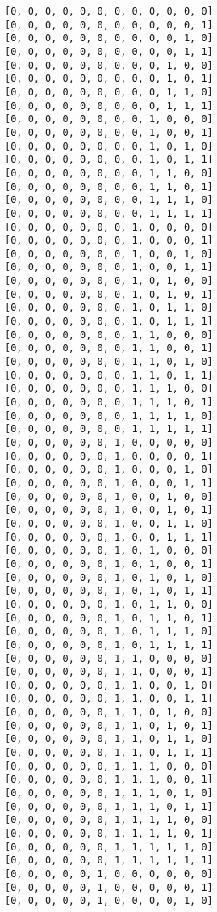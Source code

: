 \documentclass[11pt]{article}
\begin{document}
    \begin{Verbatim}[commandchars=\\\{\}]
[0, 0, 0, 0, 0, 0, 0, 0, 0, 0, 0, 0]
[0, 0, 0, 0, 0, 0, 0, 0, 0, 0, 0, 1]
[0, 0, 0, 0, 0, 0, 0, 0, 0, 0, 1, 0]
[0, 0, 0, 0, 0, 0, 0, 0, 0, 0, 1, 1]
[0, 0, 0, 0, 0, 0, 0, 0, 0, 1, 0, 0]
[0, 0, 0, 0, 0, 0, 0, 0, 0, 1, 0, 1]
[0, 0, 0, 0, 0, 0, 0, 0, 0, 1, 1, 0]
[0, 0, 0, 0, 0, 0, 0, 0, 0, 1, 1, 1]
[0, 0, 0, 0, 0, 0, 0, 0, 1, 0, 0, 0]
[0, 0, 0, 0, 0, 0, 0, 0, 1, 0, 0, 1]
[0, 0, 0, 0, 0, 0, 0, 0, 1, 0, 1, 0]
[0, 0, 0, 0, 0, 0, 0, 0, 1, 0, 1, 1]
[0, 0, 0, 0, 0, 0, 0, 0, 1, 1, 0, 0]
[0, 0, 0, 0, 0, 0, 0, 0, 1, 1, 0, 1]
[0, 0, 0, 0, 0, 0, 0, 0, 1, 1, 1, 0]
[0, 0, 0, 0, 0, 0, 0, 0, 1, 1, 1, 1]
[0, 0, 0, 0, 0, 0, 0, 1, 0, 0, 0, 0]
[0, 0, 0, 0, 0, 0, 0, 1, 0, 0, 0, 1]
[0, 0, 0, 0, 0, 0, 0, 1, 0, 0, 1, 0]
[0, 0, 0, 0, 0, 0, 0, 1, 0, 0, 1, 1]
[0, 0, 0, 0, 0, 0, 0, 1, 0, 1, 0, 0]
[0, 0, 0, 0, 0, 0, 0, 1, 0, 1, 0, 1]
[0, 0, 0, 0, 0, 0, 0, 1, 0, 1, 1, 0]
[0, 0, 0, 0, 0, 0, 0, 1, 0, 1, 1, 1]
[0, 0, 0, 0, 0, 0, 0, 1, 1, 0, 0, 0]
[0, 0, 0, 0, 0, 0, 0, 1, 1, 0, 0, 1]
[0, 0, 0, 0, 0, 0, 0, 1, 1, 0, 1, 0]
[0, 0, 0, 0, 0, 0, 0, 1, 1, 0, 1, 1]
[0, 0, 0, 0, 0, 0, 0, 1, 1, 1, 0, 0]
[0, 0, 0, 0, 0, 0, 0, 1, 1, 1, 0, 1]
[0, 0, 0, 0, 0, 0, 0, 1, 1, 1, 1, 0]
[0, 0, 0, 0, 0, 0, 0, 1, 1, 1, 1, 1]
[0, 0, 0, 0, 0, 0, 1, 0, 0, 0, 0, 0]
[0, 0, 0, 0, 0, 0, 1, 0, 0, 0, 0, 1]
[0, 0, 0, 0, 0, 0, 1, 0, 0, 0, 1, 0]
[0, 0, 0, 0, 0, 0, 1, 0, 0, 0, 1, 1]
[0, 0, 0, 0, 0, 0, 1, 0, 0, 1, 0, 0]
[0, 0, 0, 0, 0, 0, 1, 0, 0, 1, 0, 1]
[0, 0, 0, 0, 0, 0, 1, 0, 0, 1, 1, 0]
[0, 0, 0, 0, 0, 0, 1, 0, 0, 1, 1, 1]
[0, 0, 0, 0, 0, 0, 1, 0, 1, 0, 0, 0]
[0, 0, 0, 0, 0, 0, 1, 0, 1, 0, 0, 1]
[0, 0, 0, 0, 0, 0, 1, 0, 1, 0, 1, 0]
[0, 0, 0, 0, 0, 0, 1, 0, 1, 0, 1, 1]
[0, 0, 0, 0, 0, 0, 1, 0, 1, 1, 0, 0]
[0, 0, 0, 0, 0, 0, 1, 0, 1, 1, 0, 1]
[0, 0, 0, 0, 0, 0, 1, 0, 1, 1, 1, 0]
[0, 0, 0, 0, 0, 0, 1, 0, 1, 1, 1, 1]
[0, 0, 0, 0, 0, 0, 1, 1, 0, 0, 0, 0]
[0, 0, 0, 0, 0, 0, 1, 1, 0, 0, 0, 1]
[0, 0, 0, 0, 0, 0, 1, 1, 0, 0, 1, 0]
[0, 0, 0, 0, 0, 0, 1, 1, 0, 0, 1, 1]
[0, 0, 0, 0, 0, 0, 1, 1, 0, 1, 0, 0]
[0, 0, 0, 0, 0, 0, 1, 1, 0, 1, 0, 1]
[0, 0, 0, 0, 0, 0, 1, 1, 0, 1, 1, 0]
[0, 0, 0, 0, 0, 0, 1, 1, 0, 1, 1, 1]
[0, 0, 0, 0, 0, 0, 1, 1, 1, 0, 0, 0]
[0, 0, 0, 0, 0, 0, 1, 1, 1, 0, 0, 1]
[0, 0, 0, 0, 0, 0, 1, 1, 1, 0, 1, 0]
[0, 0, 0, 0, 0, 0, 1, 1, 1, 0, 1, 1]
[0, 0, 0, 0, 0, 0, 1, 1, 1, 1, 0, 0]
[0, 0, 0, 0, 0, 0, 1, 1, 1, 1, 0, 1]
[0, 0, 0, 0, 0, 0, 1, 1, 1, 1, 1, 0]
[0, 0, 0, 0, 0, 0, 1, 1, 1, 1, 1, 1]
[0, 0, 0, 0, 0, 1, 0, 0, 0, 0, 0, 0]
[0, 0, 0, 0, 0, 1, 0, 0, 0, 0, 0, 1]
[0, 0, 0, 0, 0, 1, 0, 0, 0, 0, 1, 0]

\end{Verbatim}
\end{document}
